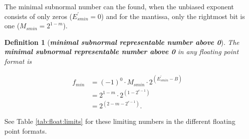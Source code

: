 \documentclass{article}
\theoremstyle{plain} %
\newtheorem{definition}{Definition}[section]
\theoremstyle{convention} %
\theoremstyle{remark} %
\def\df#1{\textbf{\textit{#1}}}
\numberwithin{equation}{section}
\begin{document}
The minimal subnormal number can the found, when the unbiased exponent consists of only zeros ($E^{\prime}_{smin} = 0$) and for the mantissa, only the rightmost bit is one ($M_{smin} = 2^{1-m}$).

\begin{definition}[\df{minimal subnormal representable number above \num{0}}]

The \df{minimal subnormal representable number above \num{0}} in any floating point format is

\begin{align*}
    f_{min} &= (-1)^0 \cdot M_{smin} \cdot 2^{(E^{\prime}_{smin} - B)} \\
            &= 2^{1-m} \cdot 2^{(1 - 2^{e-1})} \\
            &= 2^{(2 -m -2^{e-1})}.
\end{align*}

\end{definition}

See Table \ref{tab:float:limits} for these limiting numbers in the different floating point formats.
\end{document}
